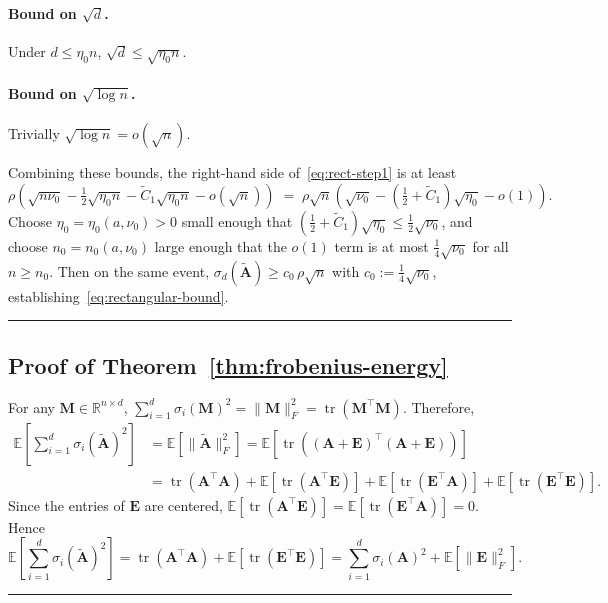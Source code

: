 \documentclass{article}
\newcommand{\Ex}[1]{\mbox{}\mathbb{E}\left[#1\right]}
\newcommand{\R}{\mathbb{R}} %
\newcommand{\Ab}{\mathbf{A}}
\newcommand{\Eb}{\mathbf{E}}
\newcommand{\Mb}{\mathbf{M}}
\newcommand{\Abtil}{\tilde{\Ab}}
\newcommand{\BlackBox}{\rule{1.5ex}{1.5ex}}  %
\newenvironment{proof}{\par\noindent{\bf Proof\ }}{\hfill\BlackBox\par\medskip}
\newcommand{\tr}{\mathop{\mathrm{tr}}}
\newcommand{\rbr}[1]{\left(#1\right)}
\begin{document}
\begin{proof}
\paragraph{Bound on $\sqrt{d}$.} Under $d \le \eta_0 n$, $\sqrt{d} \le \sqrt{\eta_0 n}$.

\paragraph{Bound on $\sqrt{\log n}$.} Trivially $\sqrt{\log n} = o(\sqrt{n})$.

Combining these bounds, the right-hand side of~\eqref{eq:rect-step1} is at least
\begin{equation*}
    \rho\rbr{\sqrt{n\nu_0} - \tfrac{1}{2}\sqrt{\eta_0 n} - \widetilde{C}_1\sqrt{\eta_0 n} - o(\sqrt{n})} \;=\; \rho\sqrt{n}\rbr{\sqrt{\nu_0} - \rbr{\tfrac{1}{2} + \widetilde{C}_1}\sqrt{\eta_0} - o(1)}.
\end{equation*}
Choose $\eta_0 = \eta_0(a, \nu_0) > 0$ small enough that $\rbr{\tfrac{1}{2} + \widetilde{C}_1}\sqrt{\eta_0} \le \tfrac{1}{2}\sqrt{\nu_0}$, and choose $n_0 = n_0(a, \nu_0)$ large enough that the $o(1)$ term is at most $\tfrac{1}{4}\sqrt{\nu_0}$ for all $n \ge n_0$. Then on the same event, $\sigma_d(\Abtil) \ge c_0\,\rho\sqrt{n}$ with $c_0 := \tfrac{1}{4}\sqrt{\nu_0}$, establishing~\eqref{eq:rectangular-bound}.
\end{proof}
\subsection{Proof of Theorem~\ref{thm:frobenius-energy}}\label{app:frobenius-energy}

\begin{proof}
For any $\Mb \in \R^{n\times d}$, $\sum_{i=1}^{d}\sigma_i(\Mb)^2 = \|\Mb\|_F^2 = \tr(\Mb^\top \Mb)$. Therefore,
\begin{align*}
    \Ex{\sum_{i=1}^{d}\sigma_i(\Abtil)^2}
    &= \Ex{\|\Abtil\|_F^2} = \Ex{\tr\rbr{(\Ab+\Eb)^\top(\Ab+\Eb)}}\\
    &= \tr(\Ab^\top \Ab) + \Ex{\tr(\Ab^\top \Eb)} + \Ex{\tr(\Eb^\top \Ab)} + \Ex{\tr(\Eb^\top \Eb)}.
\end{align*}
Since the entries of $\Eb$ are centered, $\Ex{\tr(\Ab^\top\Eb)} = \Ex{\tr(\Eb^\top\Ab)} = 0$. Hence
\begin{equation*}
    \Ex{\sum_{i=1}^{d}\sigma_i(\Abtil)^2} = \tr(\Ab^\top\Ab) + \Ex{\tr(\Eb^\top\Eb)} = \sum_{i=1}^{d}\sigma_i(\Ab)^2 + \Ex{\|\Eb\|_F^2}.
\end{equation*}
\end{proof}
\end{document}

